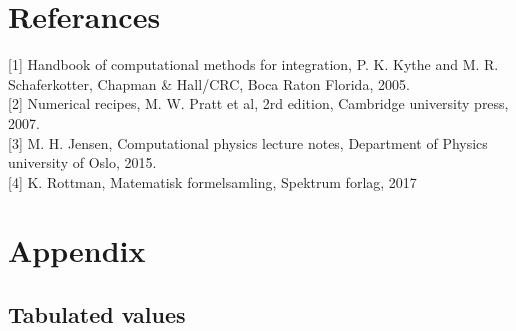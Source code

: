 \documentclass[%
reprint,nofootinbib,
amsmath,amssymb,
aps,
]{revtex4-1}
\begin{document}
\section{Referances}
[1] Handbook of computational methods for integration, P. K. Kythe and M. R. Schaferkotter, Chapman \& Hall/CRC, Boca Raton Florida, 2005.\\

[2] Numerical recipes, M. W. Pratt et al, 2rd edition, Cambridge university press, 2007.\\  

[3] M. H. Jensen, Computational physics lecture notes, Department of Physics university of Oslo, 2015. \\

[4] K. Rottman, Matematisk formelsamling, Spektrum forlag, 2017
\newpage 
\section{Appendix}
\subsection{Tabulated values}
\end{document}
